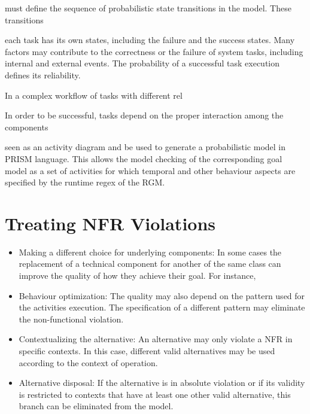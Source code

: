 must define the sequence of probabilistic state transitions in the model. These transitions 


each task has its own states, including the failure and the success states. Many factors may contribute to the correctness or the failure of system tasks, including internal and external events. The probability of a successful task execution defines its reliability. 

In a complex workflow of tasks with different rel 


 In order to be successful, tasks depend on the proper interaction among the components 

seen as an activity diagram and be used to generate a probabilistic model in PRISM language. This allows the model checking of the corresponding goal model as a set of activities for which temporal and other behaviour aspects are specified by the runtime regex of the RGM.

\section{Treating NFR Violations}

\begin{itemize}

\item Making a different choice for underlying components: In some cases the replacement of a technical component for another of the same class can improve the quality of how they achieve their goal. For instance,
\medskip

\item Behaviour optimization: The quality may also depend on the pattern used for the activities execution. The specification of a different pattern may eliminate the non-functional violation. 
\medskip

\item Contextualizing the alternative: An alternative may only violate a NFR in specific contexts. In this case, different valid alternatives may be used according to the context of operation.
\medskip

\item Alternative disposal: If the alternative is in absolute violation or if its validity is restricted to contexts that have at least one other valid alternative, this branch can be eliminated from the model.

\end{itemize}



